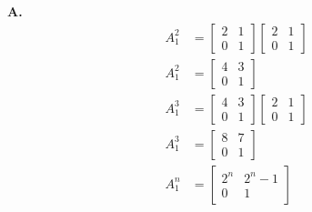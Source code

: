 \documentclass[main.tex]{subfiles}
\begin{document}
\begin{enumerate}
    \textbf{A.}
    $$
    \begin{aligned}
    A_{1}^{2} &= \left[\begin{array}{ll}
    2 & 1 \\
    0 & 1
    \end{array}\right]\left[\begin{array}{ll}
    2 & 1 \\
    0 & 1
    \end{array}\right] \\
    A_{1}^{2} &= \left[\begin{array}{ll}
    4 & 3 \\
    0 & 1
    \end{array}\right]\\
    A_{1}^{3} & = \left[\begin{array}{ll}
    4 & 3 \\
    0 & 1
    \end{array}\right]\left[\begin{array}{ll}
    2 & 1 \\
    0 & 1
    \end{array}\right] \\
    A_{1}^{3} & = \left[\begin{array}{ll}
    8 & 7 \\
    0 & 1
    \end{array}\right]\\
    A_{1}^{n} & = \left[\begin{array}{cc}
    2^{n} & 2^{n}-1 \\
    0 & 1
    \end{array}\right]
    \end{aligned}
    $$
    

\end{enumerate}
\end{document}
